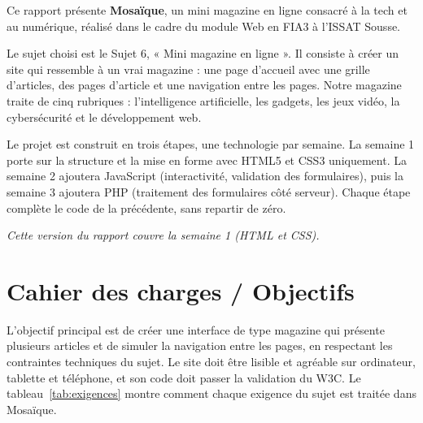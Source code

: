 \documentclass[12pt,a4paper]{article}
\begin{document}
Ce rapport présente \textbf{Mosaïque}, un mini magazine en ligne consacré
à la tech et au numérique, réalisé dans le cadre du module Web en FIA3 à
l'ISSAT Sousse.

Le sujet choisi est le Sujet 6, « Mini magazine en ligne ». Il consiste à
créer un site qui ressemble à un vrai magazine : une page d'accueil avec
une grille d'articles, des pages d'article et une navigation entre les
pages. Notre magazine traite de cinq rubriques : l'intelligence
artificielle, les gadgets, les jeux vidéo, la cybersécurité et le
développement web.

Le projet est construit en trois étapes, une technologie par semaine. La
semaine 1 porte sur la structure et la mise en forme avec HTML5 et CSS3
uniquement. La semaine 2 ajoutera JavaScript (interactivité, validation
des formulaires), puis la semaine 3 ajoutera PHP (traitement des
formulaires côté serveur). Chaque étape complète le code de la précédente,
sans repartir de zéro.

\medskip
\noindent\textit{Cette version du rapport couvre la semaine 1 (HTML et CSS).}

\section{Cahier des charges / Objectifs}

L'objectif principal est de créer une interface de type magazine qui
présente plusieurs articles et de simuler la navigation entre les pages,
en respectant les contraintes techniques du sujet. Le site doit être
lisible et agréable sur ordinateur, tablette et téléphone, et son code
doit passer la validation du W3C. Le tableau~\ref{tab:exigences} montre
comment chaque exigence du sujet est traitée dans Mosaïque.
\end{document}
